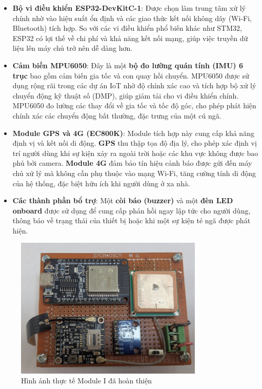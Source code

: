 \begin{itemize}
 	\item \textbf{Bộ vi điều khiển ESP32-DevKitC-1}: Được chọn làm trung tâm xử lý chính nhờ vào hiệu suất ổn định và các giao thức kết nối không dây (Wi-Fi, Bluetooth) tích hợp. So với các vi điều khiển phổ biến khác như STM32, ESP32 có lợi thế về chi phí và khả năng kết nối mạng, giúp việc truyền dữ liệu lên máy chủ trở nên dễ dàng hơn.
 	\item \textbf{Cảm biến MPU6050}: Đây là một \textbf{bộ đo lường quán tính (IMU) 6 trục} bao gồm cảm biến gia tốc và con quay hồi chuyển. MPU6050 được sử dụng rộng rãi trong các dự án IoT nhờ độ chính xác cao và tích hợp bộ xử lý chuyển động kỹ thuật số (DMP), giúp giảm tải cho vi điều khiển chính. MPU6050 đo lường các thay đổi về gia tốc và tốc độ góc, cho phép phát hiện chính xác các chuyển động bất thường, đặc trưng của một cú ngã.
 	\item \textbf{Module GPS và 4G (EC800K)}: Module tích hợp này cung cấp khả năng định vị và kết nối di động. \textbf{GPS} thu thập tọa độ địa lý, cho phép xác định vị trí người dùng khi sự kiện xảy ra ngoài trời hoặc các khu vực không được bao phủ bởi camera. \textbf{Module 4G} đảm bảo tín hiệu cảnh báo được gửi đến máy chủ xử lý mà không cần phụ thuộc vào mạng Wi-Fi, tăng cường tính di động của hệ thống, đặc biệt hữu ích khi người dùng ở xa nhà.
 	\item \textbf{Các thành phần bổ trợ}: Một \textbf{còi báo (buzzer)} và một \textbf{đèn LED onboard} được sử dụng để cung cấp phản hồi ngay lập tức cho người dùng, thông báo về trạng thái của thiết bị hoặc khi một sự kiện té ngã được phát hiện.
\end{itemize}

\begin{figure}[H]
 	\centering
 	\includegraphics[width=0.8\textwidth]{figures/real_board1.jpg}
 	\caption{Hình ảnh thực tế Module I đã hoàn thiện}
 	\label{fig:module1_photo}
\end{figure}

